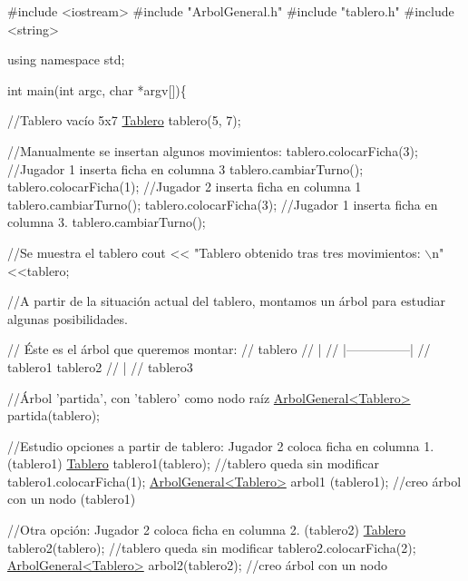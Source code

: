 \begin{DoxyCode}
\textcolor{preprocessor}{#include <iostream>}
\textcolor{preprocessor}{#include "ArbolGeneral.h"}
\textcolor{preprocessor}{#include "tablero.h"}
\textcolor{preprocessor}{#include <string>}

\textcolor{keyword}{using namespace }std;


\textcolor{keywordtype}{int} main(\textcolor{keywordtype}{int} argc, \textcolor{keywordtype}{char} *argv[])\{

  \textcolor{comment}{//Tablero vacío 5x7}
    \hyperlink{classTablero}{Tablero} tablero(5, 7);

    \textcolor{comment}{//Manualmente se insertan algunos movimientos: }
    tablero.colocarFicha(3);  \textcolor{comment}{//Jugador 1 inserta ficha en columna 3}
    tablero.cambiarTurno();
    tablero.colocarFicha(1);  \textcolor{comment}{//Jugador 2 inserta ficha en columna 1}
    tablero.cambiarTurno();
    tablero.colocarFicha(3);  \textcolor{comment}{//Jugador 1 inserta ficha en columna 3.}
    tablero.cambiarTurno();
    
    \textcolor{comment}{//Se muestra el tablero }
    cout << \textcolor{stringliteral}{"Tablero obtenido tras tres movimientos: \(\backslash\)n"}<<tablero; 

    \textcolor{comment}{//A partir de la situación actual del tablero, montamos un árbol para estudiar algunas posibilidades. }

    \textcolor{comment}{// Éste es el árbol que queremos montar: }
    \textcolor{comment}{//        tablero}
    \textcolor{comment}{//          |}
    \textcolor{comment}{//      |---------------|}
    \textcolor{comment}{//    tablero1      tablero2}
    \textcolor{comment}{//                      |}
    \textcolor{comment}{//                  tablero3}


    \textcolor{comment}{//Árbol 'partida', con 'tablero' como nodo raíz}
    \hyperlink{classArbolGeneral}{ArbolGeneral<Tablero>} partida(tablero);

    \textcolor{comment}{//Estudio opciones a partir de tablero: Jugador 2 coloca ficha en columna 1. (tablero1)}
    \hyperlink{classTablero}{Tablero} tablero1(tablero);          \textcolor{comment}{//tablero queda sin modificar}
    tablero1.colocarFicha(1);   
    \hyperlink{classArbolGeneral}{ArbolGeneral<Tablero>} arbol1 (tablero1);  \textcolor{comment}{//creo árbol con un nodo (tablero1)}

    \textcolor{comment}{//Otra opción: Jugador 2 coloca ficha en columna 2. (tablero2)}
    \hyperlink{classTablero}{Tablero} tablero2(tablero);          \textcolor{comment}{//tablero queda sin modificar}
    tablero2.colocarFicha(2);
    \hyperlink{classArbolGeneral}{ArbolGeneral<Tablero>} arbol2(tablero2);   \textcolor{comment}{//creo árbol con un nodo}


\end{DoxyCode}
